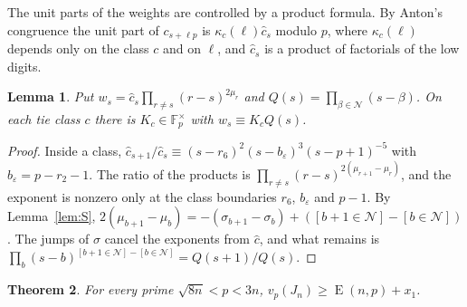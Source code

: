 \documentclass[11pt]{amsart}
\newtheorem{theorem}{Theorem}[section]
\newtheorem{lemma}[theorem]{Lemma}
\theoremstyle{definition}
\theoremstyle{remark}
\numberwithin{equation}{section}
\newcommand{\F}{\mathbb F}
\newcommand{\Lex}{\operatorname{E}}
\begin{document}
The unit parts of the weights are controlled by a product formula. By Anton's congruence
\cite[Theorem~1]{Granville97} the unit part of $c_{s+\ell p}$ is $\kappa_c(\ell)\hat c_s$ modulo $p$, where $\kappa_c(\ell)$
depends only on the class $c$ and on $\ell$, and $\hat c_s$ is a product of factorials of the low digits.

\begin{lemma}\label{lem:U}
Put $w_s=\hat c_s\prod_{r\ne s}(r-s)^{2\mu_r}$ and $Q(s)=\prod_{\beta\in\mathcal N}(s-\beta)$. On each tie class $c$
there is $K_c\in\F_p^\times$ with $w_s\equiv K_cQ(s)$.
\end{lemma}

\begin{proof}
Inside a class, $\hat c_{s+1}/\hat c_s\equiv(s-r_6)^2(s-b_\varepsilon)^3(s-p+1)^{-5}$ with $b_\varepsilon=p-r_2-1$. The ratio of
the products is $\prod_{r\ne s}(r-s)^{2(\mu_{r+1}-\mu_r)}$, and the exponent is nonzero only at the class boundaries
$r_6$, $b_\varepsilon$ and $p-1$. By Lemma~\ref{lem:S}, $2(\mu_{b+1}-\mu_b)=-(\sigma_{b+1}-\sigma_b)+([b+1\in\mathcal N]-[b\in\mathcal N])$.
The jumps of $\sigma$ cancel the exponents from $\hat c$, and what remains is
$\prod_b(s-b)^{[b+1\in\mathcal N]-[b\in\mathcal N]}=Q(s+1)/Q(s)$.
\end{proof}

\begin{theorem}\label{thm:L1}
For every prime $\sqrt{8n}<p<3n$, $v_p(J_n)\ge\Lex(n,p)+x_1$.
\end{theorem}
\end{document}
